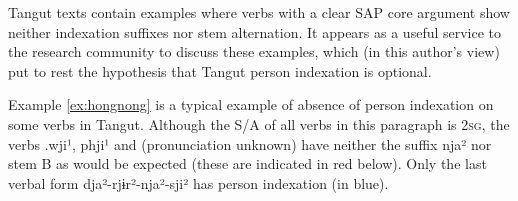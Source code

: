 \documentclass[oldfontcommands,oneside,a4paper,11pt]{article}
\newcommand{\ipa}[1]{{\phon \mbox{#1}}} %
\newcommand{\zh}[1]{{\cn #1}}
\newcommand{\tgf}[1]{\begin{tabular}{l}\mo{#1}\\{\tiny #1}\end{tabular}}
\begin{document}
 




Tangut texts contain examples where verbs with a clear SAP core argument show neither indexation suffixes nor stem alternation. It appears as a useful service to the research community to discuss these examples, which (in this author's view) put to rest the hypothesis that Tangut person indexation is optional. 

Example \ref{ex:hongnong} is a typical example of absence of person indexation on some verbs in Tangut. Although the S/A of all verbs in this paragraph is \textsc{2sg}, the verbs  \ipa{.wji¹},   \ipa{phji¹} and  (pronunciation unknown) have neither the suffix  \ipa{nja²} nor stem B as would be expected (these are indicated in red below). Only the last verbal form   \ipa{dja²}-\ipa{rjɨr²}-\ipa{nja²}-\ipa{sji²} has person indexation (in blue).
\end{document}
